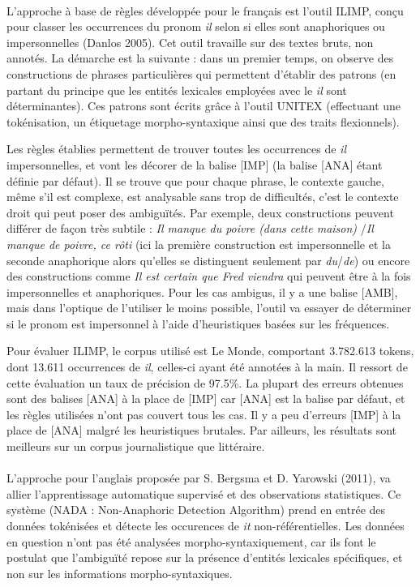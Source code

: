 \documentclass[a4paper,12pt]{article}
\begin{document}
\paragraph{}
L'approche à base de règles développée pour le français est l'outil ILIMP, conçu pour classer les occurrences du pronom \og{}\textit{il}\fg{} selon si elles sont anaphoriques ou impersonnelles (Danlos 2005). Cet outil travaille sur des textes bruts, non annotés.
La démarche est la suivante : dans un premier temps, on observe des constructions de phrases particulières qui permettent d'établir des patrons (en partant du principe que les entités lexicales employées avec le \og{}\textit{il}\fg{} sont déterminantes). Ces patrons sont écrits grâce à l'outil UNITEX (effectuant une tokénisation, un étiquetage morpho-syntaxique ainsi que des traits flexionnels).

Les règles établies permettent de trouver toutes les occurrences de \og{}\textit{il}\fg{} impersonnelles, et vont les décorer de la balise [IMP] (la balise [ANA] étant définie par défaut).
Il se trouve que pour chaque phrase, le contexte gauche, même s'il est complexe, est analysable sans trop de difficultés, c'est le contexte droit qui peut poser des ambiguïtés. Par exemple, deux constructions peuvent différer de façon très subtile : \og \textit{Il manque du poivre (dans cette maison)} \fg{}/\og \textit{Il manque de poivre, ce rôti} \fg{} (ici la première construction est impersonnelle et la seconde anaphorique alors qu'elles se distinguent seulement par \textit{du}/\textit{de}) ou encore des constructions comme \og \textit{Il est certain que Fred viendra} \fg{}  qui peuvent être à la fois impersonnelles et anaphoriques. 
Pour les cas ambigus, il y a une balise [AMB], mais dans l'optique de l'utiliser le moins possible, l'outil va essayer de déterminer si le pronom est impersonnel à l'aide d'heuristiques basées sur les fréquences.

Pour évaluer ILIMP, le corpus utilisé est Le Monde, comportant 3.782.613 tokens, dont 13.611 occurrences de \og{}\textit{il}\fg{}, celles-ci ayant été annotées à la main. Il ressort de cette évaluation un taux de précision de 97.5\%. La plupart des erreurs obtenues sont des balises [ANA] à la place de [IMP] car [ANA] est la balise par défaut, et les règles utilisées n'ont pas couvert tous les cas. Il y a peu d'erreurs [IMP] à la place de [ANA] malgré les heuristiques brutales.
Par ailleurs, les résultats sont meilleurs sur un corpus journalistique que littéraire.


\paragraph{}
L'approche pour l'anglais proposée par S. Bergsma et D. Yarowski (2011), va allier l'apprentissage automatique supervisé et des observations statistiques.
Ce système (NADA : Non-Anaphoric Detection Algorithm) prend en entrée des données tokénisées et détecte les occurences de \og{}\textit{it}\fg{} non-référentielles. Les données en question n'ont pas été analysées morpho-syntaxiquement, car ils font le postulat que l'ambiguïté repose sur la présence d'entités lexicales spécifiques, et non sur les informations morpho-syntaxiques.
\end{document}

